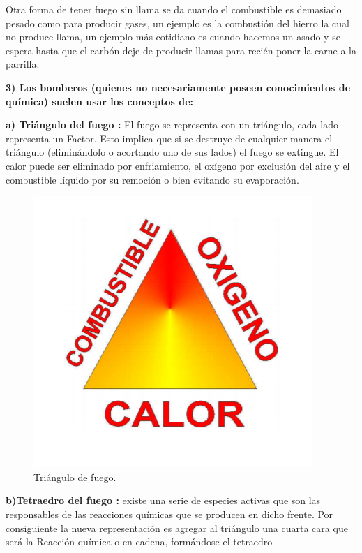 \documentclass[letterpaper,11pt]{article}
\begin{document}
Otra forma de tener fuego sin llama se da cuando el combustible es demasiado pesado como para producir gases, un ejemplo es la combustión del hierro la cual no produce llama, un ejemplo más cotidiano es cuando hacemos un asado y se espera hasta que el carbón deje de producir llamas para recién poner la carne a la parrilla.



\textbf{3) Los bomberos (quienes no necesariamente poseen conocimientos de química) suelen usar los conceptos de:}

\textbf{a) Triángulo del fuego : }El fuego se representa con un triángulo, cada lado representa un Factor. Esto implica que si se destruye de cualquier manera el triángulo (eliminándolo o acortando uno de sus lados) el fuego se extingue.
El calor puede ser eliminado por enfriamiento, el oxígeno por exclusión del aire y el combustible líquido por su remoción o bien evitando su evaporación.

\begin{figure}[H]
\centering
\includegraphics[scale=0.6]{triangulo de fuego.PNG} 
\caption{Triángulo de fuego.}
\label{fig:fig1}
\end{figure}

\textbf{b)Tetraedro del fuego : }existe una serie de especies activas que son las responsables de las reacciones químicas que se producen en dicho frente. Por consiguiente la nueva representación es agregar al triángulo una cuarta cara que será la Reacción química o en cadena, formándose el tetraedro
\end{document}
